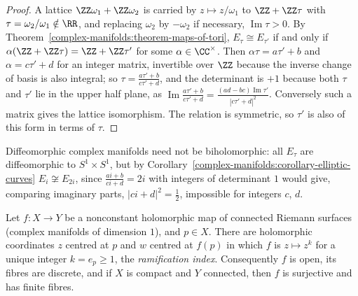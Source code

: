 \begin{proof}
A lattice $\ZZ\omega_1 + \ZZ\omega_2$ is carried by $z \mapsto z/\omega_1$ to $\ZZ + \ZZ\tau$ with $\tau = \omega_2/\omega_1 \notin \RR$, and replacing $\omega_2$ by $-\omega_2$ if necessary, $\operatorname{Im}\tau > 0$. By
Theorem~\ref{complex-manifolds:theorem-maps-of-tori}, $E_\tau \cong E_{\tau'}$ if and only if $\alpha(\ZZ + \ZZ\tau) = \ZZ + \ZZ\tau'$ for some $\alpha \in \CC^\times$. Then $\alpha\tau = a\tau' + b$ and $\alpha = c\tau' + d$ for an integer matrix,
invertible over $\ZZ$ because the inverse change of basis is also integral; so $\tau = \frac{a\tau' + b}{c\tau' + d}$, and the determinant is $+1$ because both $\tau$ and $\tau'$ lie in the upper half plane, as
$\operatorname{Im}\frac{a\tau' + b}{c\tau' + d} = \frac{(ad - bc)\operatorname{Im}\tau'}{|c\tau' + d|^2}$. Conversely such a matrix gives the lattice isomorphism. The relation is symmetric, so $\tau'$ is also of this form in terms of $\tau$.
\end{proof}

\begin{counterexample}\label{complex-manifolds:counterexample-tori}
Diffeomorphic complex manifolds need not be biholomorphic: all $E_\tau$ are diffeomorphic to $S^1 \times S^1$, but by Corollary~\ref{complex-manifolds:corollary-elliptic-curves} $E_i \not\cong E_{2i}$, since
$\frac{ai + b}{ci + d} = 2i$ with integers of determinant $1$ would give, comparing imaginary parts, $|ci + d|^2 = \frac12$, impossible for integers $c$, $d$.
\end{counterexample}

\begin{proposition}\label{complex-manifolds:proposition-normal-form}
Let $f \colon X \to Y$ be a nonconstant holomorphic map of connected Riemann surfaces (complex manifolds of dimension $1$), and $p \in X$. There are holomorphic coordinates $z$ centred at $p$ and $w$ centred at $f(p)$ in
which $f$ is $z \mapsto z^k$ for a unique integer $k = e_p \geq 1$, the \emph{ramification index}. Consequently $f$ is open, its fibres are discrete, and if $X$ is compact and $Y$ connected, then $f$ is surjective and
has finite fibres.
\end{proposition}

